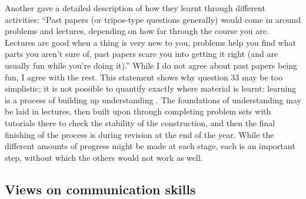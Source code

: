 Another gave a detailed description of how they learnt through different activities: ``Past papers (or tripos-type questions generally) would come in around problems and lectures, depending on how far through the course you are. Lectures are good when a thing is very new to you, problems help you find what parts you aren't sure of, past papers scare you into getting it right (and are usually fun while you're doing it).'' While I do not agree about past papers being fun, I agree with the rest. This statement shows why question 33 may be too simplistic; it is not possible to quantify exactly where material is learnt: learning is a process of building up understanding \citep[chapter 2]{Kolb1984}. The foundations of understanding may be laid in lectures, then built upon through completing problem sets with tutorials there to check the stability of the construction, and then the final finishing of the process is during revision at the end of the year. While the different amounts of progress might be made at each stage, each is an important step, without which the others would not work as well.

\subsection{Views on communication skills}\label{sec:comm-results}

